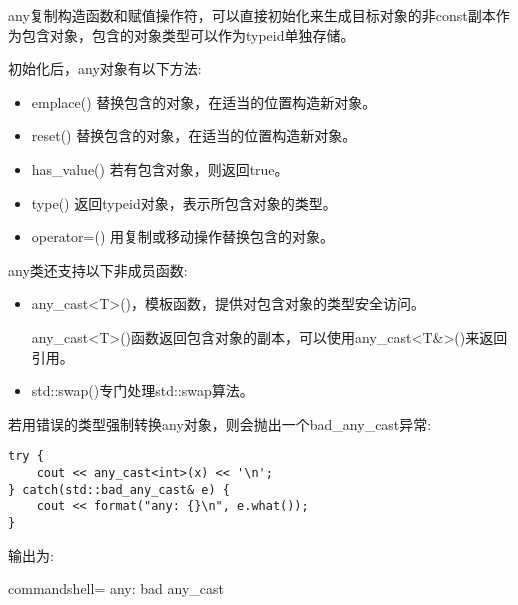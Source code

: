 any复制构造函数和赋值操作符，可以直接初始化来生成目标对象的非const副本作为包含对象，包含的对象类型可以作为typeid单独存储。

初始化后，any对象有以下方法:

\begin{itemize}
\item 
emplace() 替换包含的对象，在适当的位置构造新对象。

\item 
reset() 替换包含的对象，在适当的位置构造新对象。

\item 
has\_value() 若有包含对象，则返回true。

\item 
type() 返回typeid对象，表示所包含对象的类型。

\item 
operator=() 用复制或移动操作替换包含的对象。
\end{itemize}

any类还支持以下非成员函数:

\begin{itemize}
\item 
any\_cast<T>()，模板函数，提供对包含对象的类型安全访问。

any\_cast<T>()函数返回包含对象的副本，可以使用any\_cast<T\&>()来返回引用。

\item 
std::swap()专门处理std::swap算法。
\end{itemize}

若用错误的类型强制转换any对象，则会抛出一个bad\_any\_cast异常:

\begin{lstlisting}[style=styleCXX]
try {
	cout << any_cast<int>(x) << '\n';
} catch(std::bad_any_cast& e) {
	cout << format("any: {}\n", e.what());
}
\end{lstlisting}

输出为:

\begin{tcblisting}{commandshell={}}
any: bad any_cast
\end{tcblisting}

















